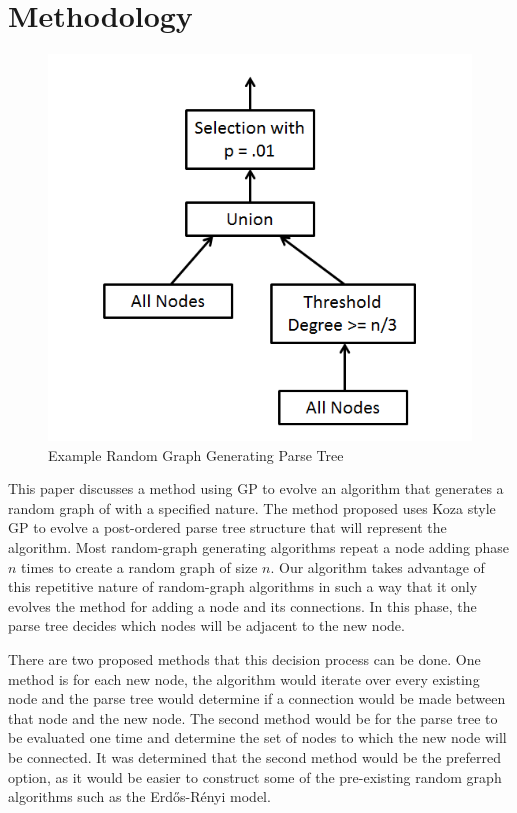 \documentclass{article}
\begin{document}
\section{Methodology}

\begin{figure}
\begin{centering}
  \includegraphics[scale=0.6]{RandomGraphExample}
  \caption{Example Random Graph Generating Parse Tree}
  \label{fig:example}
\end{centering}
\end{figure}


This paper discusses a method using GP to evolve an algorithm that generates a random graph of with a specified nature.  The method proposed uses Koza style GP to evolve a post-ordered parse tree structure that will represent the algorithm. Most random-graph generating algorithms repeat a node adding phase $n$ times to create a random graph of size $n$. Our algorithm takes advantage of this repetitive nature of random-graph algorithms in such a way that it only evolves the method for adding a node and its connections. In this phase, the parse tree decides which nodes will be adjacent to the new node.

There are two proposed methods that this decision process can be done. One method is for each new node, the algorithm would iterate over every existing node and the parse tree would determine if a connection would be made between that node and the new node. The second method would be for the parse tree to be evaluated one time and determine the set of nodes to which the new node will be connected.  It was determined that the second method would be the preferred option, as it would be easier to construct some of the pre-existing random graph algorithms such as the Erd\H{o}s-R\'{e}nyi model.
\end{document}
